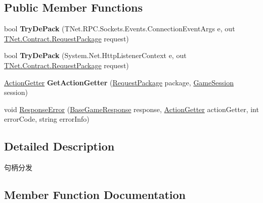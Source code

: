 \subsection*{Public Member Functions}
\begin{DoxyCompactItemize}
\item 
\mbox{\label{interface_t_net_1_1_coms_1_1_f_f_1_1_i_handler_dispatcher_a56be89c9deef3488d0c2a381e414b8c4}} 
bool {\bfseries Try\+De\+Pack} (T\+Net.\+R\+P\+C.\+Sockets.\+Events.\+Connection\+Event\+Args e, out \mbox{\hyperlink{class_t_net_1_1_contract_1_1_request_package}{T\+Net.\+Contract.\+Request\+Package}} request)
\item 
\mbox{\label{interface_t_net_1_1_coms_1_1_f_f_1_1_i_handler_dispatcher_a2bc4e9779e8468ed437c411b334be735}} 
bool {\bfseries Try\+De\+Pack} (System.\+Net.\+Http\+Listener\+Context e, out \mbox{\hyperlink{class_t_net_1_1_contract_1_1_request_package}{T\+Net.\+Contract.\+Request\+Package}} request)
\item 
\mbox{\label{interface_t_net_1_1_coms_1_1_f_f_1_1_i_handler_dispatcher_a68f5b77c7c6700e021f90b7eb8b5975d}} 
\mbox{\hyperlink{class_t_net_1_1_service_1_1_action_getter}{Action\+Getter}} {\bfseries Get\+Action\+Getter} (\mbox{\hyperlink{class_t_net_1_1_contract_1_1_request_package}{Request\+Package}} package, \mbox{\hyperlink{class_t_net_1_1_contract_1_1_game_session}{Game\+Session}} session)
\item 
void \mbox{\hyperlink{interface_t_net_1_1_coms_1_1_f_f_1_1_i_handler_dispatcher_a4959df41bf7ae8325dd7137957080523}{Response\+Error}} (\mbox{\hyperlink{class_t_net_1_1_service_1_1_base_game_response}{Base\+Game\+Response}} response, \mbox{\hyperlink{class_t_net_1_1_service_1_1_action_getter}{Action\+Getter}} action\+Getter, int error\+Code, string error\+Info)
\end{DoxyCompactItemize}


\subsection{Detailed Description}
句柄分发 



\subsection{Member Function Documentation}
\mbox{\label{interface_t_net_1_1_coms_1_1_f_f_1_1_i_handler_dispatcher_a4959df41bf7ae8325dd7137957080523}} 
